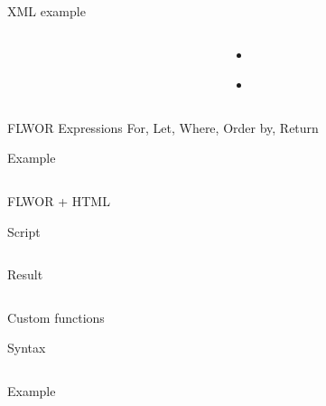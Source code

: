 \documentclass[sans]{beamer}
\begin{document}
\begin{frame}{XML example}
	\begin{columns}
		\begin{column}{0.45\linewidth}
			\inputminted[fontsize=\tiny]{xml}{codes/ex2.xml}
		\end{column}
		\begin{column}{0.55\linewidth}
			\begin{itemize}
				\item \inputminted[fontsize=\tiny]{xquery}{codes/ex3.xq}
				\item \inputminted[fontsize=\tiny]{xquery}{codes/ex4.xq}
			\end{itemize}
		\end{column}
	\end{columns}
\end{frame}

\begin{frame}{FLWOR Expressions}
	For, Let, Where, Order by, Return

	\vspace{1cm}

	\begin{block}{Example}
		\inputminted{xquery}{codes/ex5.xq}
	\end{block}
\end{frame}

\begin{frame}{FLWOR + HTML}
	\begin{block}{Script}
		\inputminted[fontsize=\footnotesize]{xquery}{codes/ex6.html}
	\end{block}

	\begin{block}{Result}
		\inputminted[fontsize=\footnotesize]{html}{codes/ex7.html}
	\end{block}
\end{frame}

\begin{frame}{Custom functions}
	\begin{block}{Syntax}
		\inputminted[fontsize=\tiny]{xquery}{codes/ex8.xq}
	\end{block}
	\begin{block}{Example}
		\inputminted[fontsize=\tiny]{xquery}{codes/ex9.xq}
	\end{block}
\end{frame}

\end{document}

